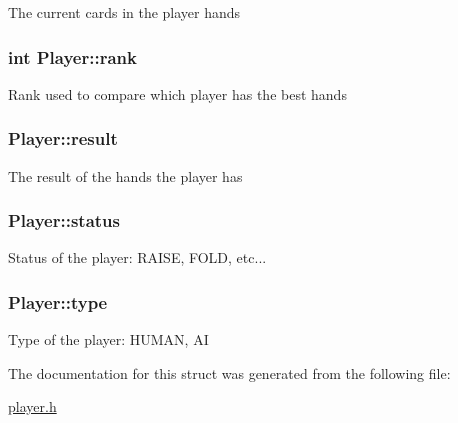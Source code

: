 The current cards in the player hands \hypertarget{structPlayer_a307c222c67b1318ec1d7dc9095c50a98}{
\subsubsection[{rank}]{\setlength{\rightskip}{0pt plus 5cm}int Player\+::rank}}\label{structPlayer_a307c222c67b1318ec1d7dc9095c50a98}
Rank used to compare which player has the best hands \hypertarget{structPlayer_a6c2e05abd5b83faf72239511f992af36}{
\subsubsection[{result}]{ Player\+::result}}\label{structPlayer_a6c2e05abd5b83faf72239511f992af36}
The result of the hands the player has \hypertarget{structPlayer_aeb08943a32834515e66222d2e948292d}{
\subsubsection[{status}]{ Player\+::status}}\label{structPlayer_aeb08943a32834515e66222d2e948292d}
Status of the player\+: R\+A\+I\+S\+E, F\+O\+L\+D, etc... \hypertarget{structPlayer_a89a4fdb70177957727ae3816b962ca2f}{
\subsubsection[{type}]{ Player\+::type}}\label{structPlayer_a89a4fdb70177957727ae3816b962ca2f}
Type of the player\+: H\+U\+M\+A\+N, A\+I 

The documentation for this struct was generated from the following file\+:\begin{DoxyCompactItemize}
\item 
\hyperlink{player_8h}{player.\+h}\end{DoxyCompactItemize}
